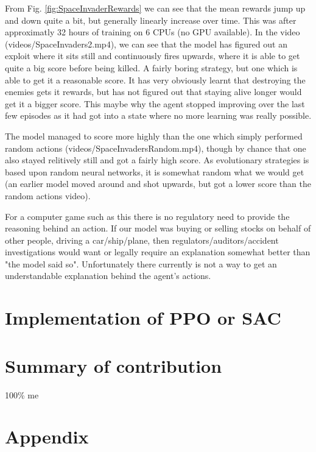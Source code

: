 \documentclass[a4pape, 11pt, english]{article}
\begin{document}
From Fig. \ref{fig:SpaceInvaderRewards} we can see that the mean rewards jump up and down quite a bit, but generally linearly increase over time. This was after approximatly 32 hours of training on 6 CPUs (no GPU available). In the video (videos/SpaceInvaders2.mp4), we can see that the model has figured out an exploit where it sits still and continuously fires upwards, where it is able to get quite a big score before being killed. A fairly boring strategy, but one which is able to get it a reasonable score. It has very obviously learnt that destroying the enemies gets it rewards, but has not figured out that staying alive longer would get it a bigger score. This maybe why the agent stopped improving over the last few episodes as it had got into a state where no more learning was really possible.

The model managed to score more highly than the one which simply performed random actions (videos/SpaceInvadersRandom.mp4), though by chance that one also stayed relitively still and got a fairly high score. As evolutionary strategies is based upon random neural networks, it is somewhat random what we would get (an earlier model moved around and shot upwards, but got a lower score than the random actions video).

For a computer game such as this there is no regulatory need to provide the reasoning behind an action. If our model was buying or selling stocks on behalf of other people, driving a car/ship/plane, then regulators/auditors/accident investigations would want or legally require an explanation somewhat better than "the model said so". Unfortunately there currently is not a way to get an understandable explanation behind the agent's actions.

\section{Implementation of PPO or SAC}

\section{Summary of contribution}
100\% me



\section{Appendix}
\end{document}
